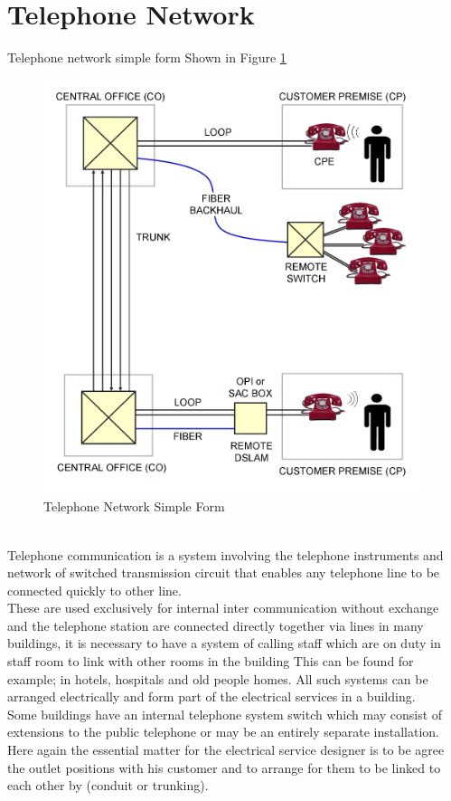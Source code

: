 \documentclass[12pt,fleqn]{book} %
\begin{document}
\section{Telephone Network}
Telephone network simple form Shown in Figure \ref{fig:hamdy 48}
 \begin{figure}[!h]
    \centering
    \includegraphics[width=1\linewidth]{hamdy 48.png}
    \caption{Telephone Network Simple Form}
    \label{fig:hamdy 48}
    \end{figure}
\\ Telephone communication is a system involving the telephone instruments and network of switched transmission circuit that enables any telephone line to be connected quickly to other line.
\\ These are used exclusively for internal inter communication without exchange and the telephone station are connected directly together via lines in many buildings, it is necessary to have a system of calling staff which are on duty in staff room to link with other rooms in the building This can be found for example; in hotels, hospitals and old people homes. All such systems can be arranged electrically and form part of the electrical services in a building.
\\ Some buildings have an internal telephone system switch which may consist of extensions to the public telephone or may be an entirely separate installation. Here again the essential matter for the electrical service designer is to be agree the outlet positions with his customer and to arrange for them to be linked to each other by (conduit or trunking).
\end{document}
